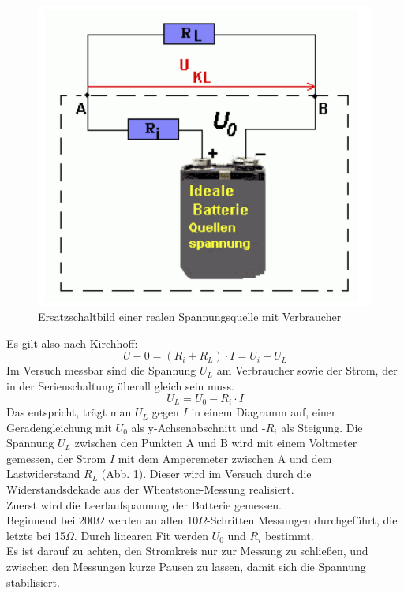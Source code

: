 \documentclass[12pt,a4paper]{article}
\begin{document}
\begin{multicols}{2}
\begin{figure}[H]
	\centering
	\includegraphics[scale=0.80]{./figure/innenwiderstand_schaltskizze.png}
	\caption{Ersatzschaltbild einer realen Spannungsquelle mit Verbraucher}
	\label{fig:innenwiderstand_schaltskizze}
\end{figure}

Es gilt also nach Kirchhoff:
$$U-0 = (R_i + R_L) \cdot I = U_i + U_L$$
Im Versuch messbar sind die Spannung $U_L$ am Verbraucher sowie der Strom, der in der Serienschaltung überall gleich sein muss.
$$U_L = U_0 - R_i \cdot I$$
Das entspricht, trägt man $U_L$ gegen $I$ in einem Diagramm auf,  einer Geradengleichung mit $U_0$ als y-Achsenabschnitt und -$R_i$ als Steigung.
Die Spannung $U_L $ zwischen den Punkten A und B wird mit einem Voltmeter gemessen, der Strom $I$ mit dem Amperemeter zwischen A und dem Lastwiderstand $R_L$ (Abb. \ref{fig:innenwiderstand_schaltskizze}). Dieser wird im Versuch durch die Widerstandsdekade aus der Wheatstone-Messung realisiert.\\
Zuerst wird die Leerlaufspannung der Batterie gemessen.\\
Beginnend bei 200$\Omega $ werden an allen 10$\Omega$-Schritten Messungen durchgeführt, die letzte bei 15$\Omega$. Durch linearen Fit werden $U_0$ und $R_i$ bestimmt.\\
Es ist darauf zu achten, den Stromkreis nur zur Messung zu schließen, und zwischen den Messungen kurze Pausen zu lassen, damit sich die Spannung stabilisiert.


\end{multicols}
\end{document}
